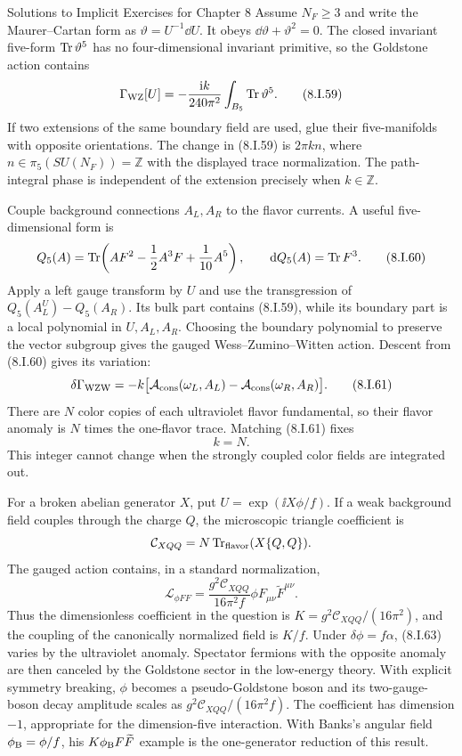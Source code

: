 \begin{bankssolutions}{Solutions to Implicit Exercises for Chapter 8}
Assume $N_F\ge3$ and write the Maurer--Cartan form as
$\vartheta=U^{-1}\dd U$.  It obeys
$\dd\vartheta+\vartheta^2=0$.  The closed invariant five-form
$\operatorname{Tr}\vartheta^5$ has no four-dimensional invariant primitive, so the
Goldstone action contains
\[
 \Gamma_{\rm WZ}[U]=-\frac{\mathrm{i} k}{240\pi^2}
 \int_{B_5}\operatorname{Tr}\vartheta^5. \tag{8.I.59}
\]
If two extensions of the same boundary field are used, glue their
five-manifolds with opposite orientations.  The change in (8.I.59) is
$2\pi k n$, where $n\in\pi_5(SU(N_F))=\mathbb Z$ with the displayed trace
normalization.  The path-integral phase is independent of the extension
precisely when $k\in\mathbb Z$.

Couple background connections $A_L,A_R$ to the flavor currents.  A useful
five-dimensional form is
\[
 Q_5(A)=\operatorname{Tr}\!\left(AF^2-\frac12A^3F+\frac1{10}A^5\right),
 \qquad \mathop{}\!\mathrm{d} Q_5(A)=\operatorname{Tr} F^3. \tag{8.I.60}
\]
Apply a left gauge transform by $U$ and use the transgression of
$Q_5(A_L^U)-Q_5(A_R)$.  Its bulk part contains (8.I.59), while its boundary
part is a local polynomial in $U,A_L,A_R$.  Choosing the boundary polynomial
to preserve the vector subgroup gives the gauged Wess--Zumino--Witten action.
Descent from (8.I.60) gives its variation:
\[
 \delta\Gamma_{\rm WZW}
 =-k\bigl[\mathcal A_{\rm cons}(\omega_L,A_L)
          -\mathcal A_{\rm cons}(\omega_R,A_R)\bigr]. \tag{8.I.61}
\]
There are $N$ color copies of each ultraviolet flavor fundamental, so their
flavor anomaly is $N$ times the one-flavor trace.  Matching (8.I.61) fixes
\[
 k=N. \tag{8.I.62}
\]
This integer cannot change when the strongly coupled color fields are
integrated out.

For a broken abelian generator $X$, put
$U=\exp(\ii X\phi/f)$.  If a weak background field couples through the charge
$Q$, the microscopic triangle coefficient is
\[
 \mathcal C_{XQQ}=N\operatorname{Tr}_{\rm flavor}(X\{Q,Q\}).
\]
The gauged action contains, in a standard normalization,
\[
 \mathcal L_{\phi FF}
 =\frac{g^2\mathcal C_{XQQ}}{16\pi^2f}
 \phi F_{\mu\nu}\widetilde F^{\mu\nu}. \tag{8.I.63}
\]
Thus the dimensionless coefficient in the question is
$K=g^2\mathcal C_{XQQ}/(16\pi^2)$, and the coupling of the canonically
normalized field is $K/f$.
Under $\delta\phi=f\alpha$, (8.I.63) varies by the ultraviolet anomaly.
Spectator fermions with the opposite anomaly are then canceled by the
Goldstone sector in the low-energy theory.  With explicit symmetry breaking,
$\phi$ becomes a pseudo-Goldstone boson and its two-gauge-boson decay amplitude
scales as $g^2\mathcal C_{XQQ}/(16\pi^2f)$.  The coefficient has dimension
$-1$, appropriate for the dimension-five interaction.  With Banks's angular
field $\phi_{\rm B}=\phi/f$, his $K\phi_{\rm B}F\widetilde F$ example is the
one-generator reduction of this result.


\end{bankssolutions}
